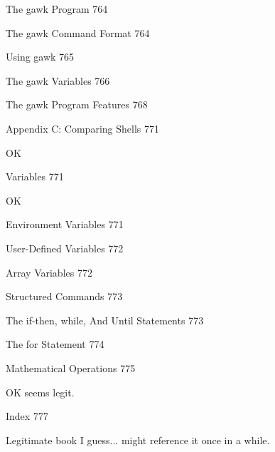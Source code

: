 The gawk Program 764



The gawk Command Format 764



Using gawk 765



The gawk Variables 766



The gawk Program Features 768



Appendix C: Comparing Shells 771

OK

Variables 771

OK

Environment Variables 771



User-Defined Variables 772



Array Variables 772



Structured Commands 773



The if-then, while, And Until Statements 773



The for Statement 774



Mathematical Operations 775

OK seems legit.

Index 777

Legitimate book I guess... might reference it once in a while.
